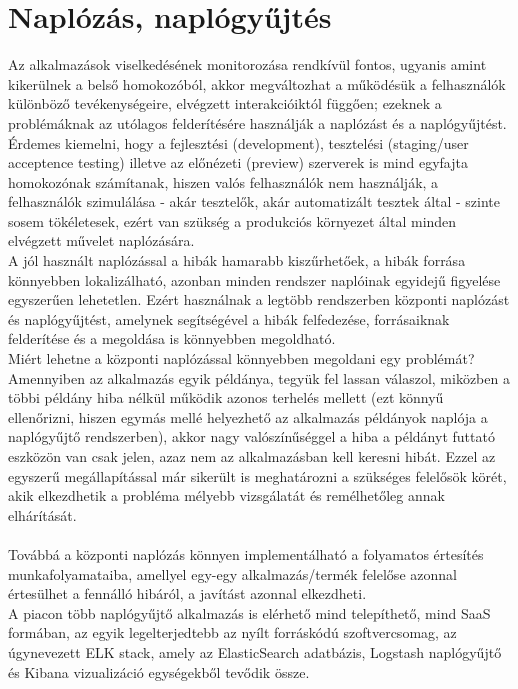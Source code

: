 \section{Naplózás, naplógyűjtés\\}
\label{sect:logging}
Az alkalmazások viselkedésének monitorozása rendkívül fontos, ugyanis amint kikerülnek a belső homokozóból, akkor megváltozhat a működésük a felhasználók különböző tevékenységeire, elvégzett interakcióiktól függően; ezeknek a problémáknak az utólagos felderítésére használják a naplózást és a naplógyűjtést. Érdemes kiemelni, hogy a fejlesztési (development), tesztelési (staging/user acceptence testing) illetve az előnézeti (preview) szerverek is mind egyfajta homokozónak számítanak, hiszen valós felhasználók nem használják, a felhasználók szimulálása - akár tesztelők, akár automatizált tesztek által - szinte sosem tökéletesek, ezért van szükség a produkciós környezet által minden elvégzett művelet naplózására.
\\
A jól használt naplózással a hibák hamarabb kiszűrhetőek, a hibák forrása könnyebben lokalizálható, azonban minden rendszer naplóinak egyidejű figyelése egyszerűen lehetetlen. Ezért használnak a legtöbb rendszerben központi naplózást és naplógyűjtést, amelynek segítségével a hibák felfedezése, forrásaiknak felderítése és a megoldása is könnyebben megoldható.\\
Miért lehetne a központi naplózással könnyebben megoldani egy problémát? Amennyiben az alkalmazás egyik példánya, tegyük fel lassan válaszol, miközben a többi példány hiba nélkül működik azonos terhelés mellett (ezt könnyű ellenőrizni, hiszen egymás mellé helyezhető az alkalmazás példányok naplója a naplógyűjtő rendszerben), akkor nagy valószínűséggel a hiba a példányt futtató eszközön van csak jelen, azaz nem az alkalmazásban kell keresni hibát. Ezzel az egyszerű megállapítással már sikerült is meghatározni a szükséges felelősök körét, akik elkezdhetik a probléma mélyebb vizsgálatát és remélhetőleg annak elhárítását.\\
\hfill\\
Továbbá a központi naplózás könnyen implementálható a folyamatos értesítés munkafolyamataiba, amellyel egy-egy alkalmazás/termék felelőse azonnal értesülhet a fennálló hibáról, a javítást azonnal elkezdheti.
\hfill\\
A piacon több naplógyűjtő alkalmazás is elérhető mind telepíthető, mind SaaS formában, az egyik legelterjedtebb az nyílt forráskódú szoftvercsomag, az úgynevezett ELK stack, amely az ElasticSearch adatbázis, Logstash naplógyűjtő és Kibana vizualizáció egységekből tevődik össze.
\\

